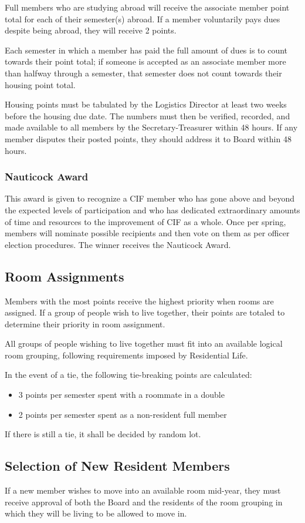 \documentclass[12pt]{amsart}
\begin{document}
Full members who are studying abroad will receive the associate member point total for each of their semester(s) abroad. If a member voluntarily pays dues despite being abroad, they will receive 2 points.

Each semester in which a member has paid the full amount of dues is to count towards their point total; if someone is accepted as an associate member more than halfway through a semester, that semester does not count towards their housing point total.

Housing points must be tabulated by the Logistics Director at least two weeks before the housing due date. The numbers must then be verified, recorded, and made available to all members by the Secretary-Treasurer within 48 hours. If any member disputes their posted points, they should address it to Board within 48 hours.
		\subsubsection {Nauticock Award}
This award is given to recognize a CIF member who has gone above and beyond the expected levels of participation and who has dedicated extraordinary amounts of time and resources to the improvement of CIF as a whole. Once per spring, members will nominate possible recipients and then vote on them as per officer election procedures. The winner receives the Nauticock Award.
	\subsection {Room Assignments}
Members with the most points receive the highest priority when rooms are assigned. If a group of people wish to live together, their points are totaled to determine their priority in room assignment.

All groups of people wishing to live together must fit into an available logical room grouping, following requirements imposed by Residential Life.

In the event of a tie, the following tie-breaking points are calculated:
\begin{itemize}
	\item 3 points per semester spent with a roommate in a double
	\item 2 points per semester spent as a non-resident full member
\end{itemize}
If there is still a tie, it shall be decided by random lot.
	\subsection {Selection of New Resident Members}
If a new member wishes to move into an available room mid-year, they must receive approval of both the Board and the residents of the room grouping in which they will be living to be allowed to move in.
\end{document}
